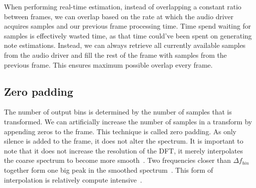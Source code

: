 \documentclass[10pt,twocolumn]{article}
\begin{document}
When performing real-time estimation, instead of overlapping a constant ratio between frames, we can overlap based on the rate at which the audio driver acquires samples and our previous frame processing time. Time spend waiting for samples is effectively wasted time, as that time could've been spent on generating note estimations. Instead, we can always retrieve all currently available samples from the audio driver and fill the rest of the frame with samples from the previous frame. This ensures maximum possible overlap every frame.

\subsection{Zero padding}  \label{sec:zeropadding}
The number of output bins is determined by the number of samples that is transformed. We can artificially increase the number of samples in a transform by appending zeros to the frame. This technique is called zero padding. As only silence is added to the frame, it does not alter the spectrum. It is important to note that it does not increase the resolution of the DFT, it merely interpolates the coarse spectrum to become more smooth~\cite{zeropad1}. Two frequencies closer than $\Delta f_{bin}$ together form one big peak in the smoothed spectrum~\cite{zeropad2}. This form of interpolation is relatively compute intensive~\cite{interpolnozero}.
\end{document}
